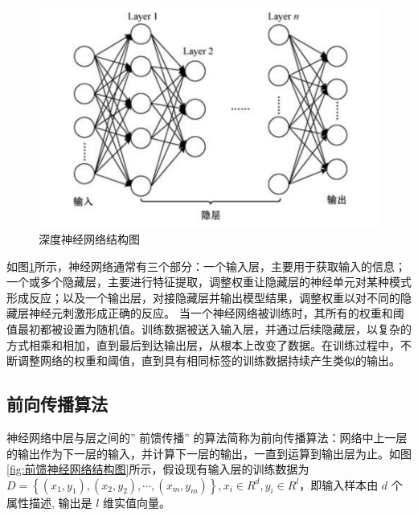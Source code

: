 \begin{figure}[!hbt]
\centering
	\includegraphics[scale=0.5]{fig2/C2/深度神经网络结构图}%
	\caption{深度神经网络结构图}
	\label{fig:深度神经网络结构图}	
\end{figure}

如图\ref{fig:深度神经网络结构图}所示，神经网络通常有三个部分：一个输入层，主要用于获取输入的信息；一个或多个隐藏层，主要进行特征提取，调整权重让隐藏层的神经单元对某种模式形成反应；以及一个输出层，对接隐藏层并输出模型结果，调整权重以对不同的隐藏层神经元刺激形成正确的反应。
当一个神经网络被训练时，其所有的权重和阈值最初都被设置为随机值。训练数据被送入输入层，并通过后续隐藏层，以复杂的方式相乘和相加，直到最后到达输出层，从根本上改变了数据。在训练过程中，不断调整网络的权重和阈值，直到具有相同标签的训练数据持续产生类似的输出。

\subsection{前向传播算法}

神经网络中层与层之间的” 前馈传播” 的算法简称为前向传播算法：网络中上一层的输出作为下一层的输入，并计算下一层的输出，一直到运算到输出层为止。如图\ref{fig:前馈神经网络结构图}所示，假设现有输入层的训练数据为$D=\left\{\left(x_{1}, y_{1}\right),\left(x_{2}, y_{2}\right), \cdots,\left(x_{m}, y_{m}\right)\right\}, x_{i} \in R^{d}, y_{i} \in R^{l}$，即输入样本由 $d$ 个属性描述, 输出是 $l$ 维实值向量。

